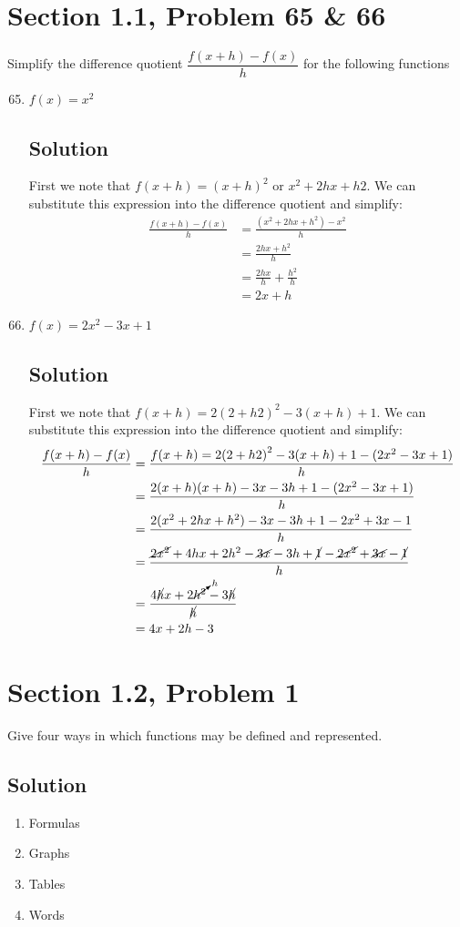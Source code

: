 \documentclass{article}
\newcommand{\problem}[2]{\vspace{5ex}\section*{Section #1, Problem #2}}
\newcommand{\solution}{\subsection*{Solution}}
\begin{document}
\problem{1.1}{65 \& 66}
Simplify the difference quotient $\dfrac{f(x+h) - f(x)}{h}$ for the following functions

\begin{enumerate}[label=\textbf{\arabic*. }]
  \setcounter{enumi}{64}
\item $f(x) = x^2$
  \solution{}
  First we note that $f(x + h) = {(x + h)}^2$ or $x^2 + 2hx + h2$. We can substitute this expression into the difference quotient and simplify:
  \begin{align*}
    \frac{f(x + h) - f(x)}{h} &= \frac{(x^2 + 2hx + h^2) - x^2}{h} \\
                              &= \frac{2hx + h^2}{h} \\
                              &= \frac{2hx}{h} + \frac{h^2}{h} \\
                              &= 2x + h
  \end{align*}
\item $f(x) = 2x^2 - 3x + 1$
  \solution{}
  First we note that $f(x + h) = 2{(2 + h2)}^2 - 3(x + h) + 1$. We can substitute this expression into the difference quotient and simplify:
  \begin{align*}
    \frac{f(x + h) - f(x)}{h} &= \frac{f(x + h) = 2{(2 + h2)}^2 - 3(x + h) + 1 - (2x^2 - 3x + 1)}{h} \\
                              &= \frac{2(x+h)(x+h) - 3x -3h + 1 - (2x^2 - 3x + 1)}{h} \\
                              &= \frac{2(x^2 + 2hx + h^2) - 3x - 3h + 1 - 2x^2 + 3x -1}{h} \\
                              &= \frac{\cancel{2x^2} + 4hx + 2h^2 - \cancel{3x} - 3h + \cancel{1} - \cancel{2x^2} + \cancel{3x} - \cancel{1}}{h} \\
                              &= \frac{4 \cancel{h} x + 2 \cancelto{h}{h^2} - 3 \cancel{h}}{\cancel{h}} \\
                              &= 4x + 2h - 3
  \end{align*}
\end{enumerate}

\pagebreak

\problem{1.2}{1}
Give four ways in which functions may be defined and  represented.

\solution{}
\begin{enumerate}
  \item Formulas
  \item Graphs
  \item Tables
  \item Words
\end{enumerate}
\end{document}
